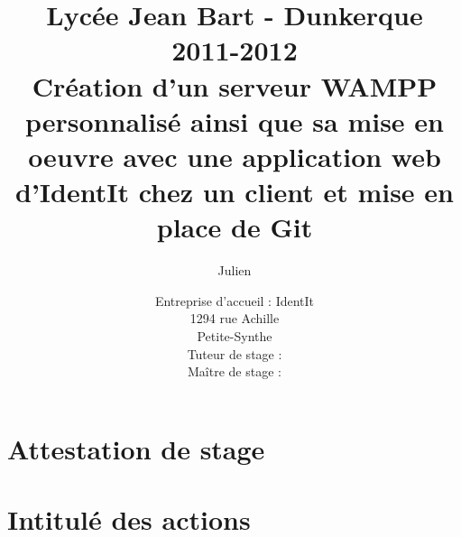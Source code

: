 \documentclass[12pt,a4paper]{report}
\title
{
	\normalsize{Lycée Jean Bart - Dunkerque\\
	2011-2012}\\
	\vspace{15mm}
  \LARGE{Création d'un serveur WAMPP personnalisé ainsi que sa mise en
    oeuvre avec une application web d'IdentIt chez un client et mise en
    place de Git
    \vspace{15mm}}
}
\author{\bsc{Stechele} Julien\\
	\vspace{35mm}
}
\date{
	\normalsize{Entreprise d'accueil : IdentIt\\
    1294 rue Achille \bsc{Pérès}\\
	Petite-Synthe\\
	\vspace{5mm}
  Tuteur de stage : \bsc{M.~Anselin}\\
	Maître de stage : \bsc{M.~Dubourg}
	}
}%
\begin{document}

\maketitle



\renewcommand{\contentsname}{Sommaire}

{\setlength{\baselineskip}{1.2\baselineskip}
\tableofcontents\par}











\appendix

\chapter{Attestation de stage} %
\label{cha:Attestation de stage}

\chapter{Intitulé des actions} %
\label{cha:Intitulé des actions}
\end{document}
